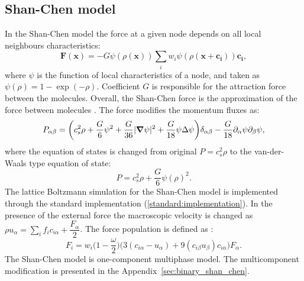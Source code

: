 \documentclass[mathpazo]{cicp}
\begin{document}
\subsection{Shan-Chen model}
In the Shan-Chen model \cite{Shan-chen:extended} the force at a given node depends
on all local neighbours characteristics:
\begin{equation}  \label{Shan-Chen:Shan-Chen:cont}
\bm{F}(\bm{x})=-G\psi(\rho(\bm{x}))\sum_{i}{w_i \psi(\rho(\bm{x}+\bm{c_i}))\bm{c_{i}}},
\end{equation}
where $\psi$ is the function of local characteristics of a node, and taken
as $\psi(\rho)=1-\exp(-\rho)$. Coefficient $G$ is responsible for the attraction
force between the molecules. Overall, the Shan-Chen force is the approximation of
the force between molecules \cite{kwok,kwok-contact-angle}. The force modifies
the momentum fluxes as:
\begin{equation*}
P_{\alpha\beta}=\biggl(c_s^2\rho+\frac{G}{6}\psi^2+\frac{G}{36}%
|\bm{\nabla}\psi|^2 +\frac{G}{18}\psi\Delta\psi\biggr)\delta_{\alpha\beta}-\frac{G}{%
18}\partial_{\alpha}\psi\partial_{\beta}\psi,
\end{equation*}
where the equation of states is changed from original $P=c_s^2 \rho$ \cite{Succi-book}
to the van-der-Waals type equation of state:
\begin{equation}
\label{shan:chen:equation:state}
P=c_s^2 \rho +\frac{G}{6} \psi(\rho)^2.
\end{equation}
The lattice Boltzmann simulation for the Shan-Chen model is implemented through the standard implementation (\ref{standard:implementation}). In the presence of the external force the macroscopic velocity is changed as $\rho u_{\alpha}=\sum_i{f_i c_{i\alpha}}+\dfrac{F_{\alpha}}{2}$. The force population is defined as \cite{guo}:
\begin{equation}
F_i=w_i\biggl(1-\frac{\omega}{2}\biggr)\biggl(3 (c_{i\alpha}-u_{\alpha}) + 9 (c_{i\beta}u_{\beta})c_{i\alpha}\biggr)F_{\alpha}.
\end{equation}
The Shan-Chen model is one-component multiphase model. The multicomponent modification is presented in the Appendix~\ref{sec:binary_shan_chen}.
\end{document}

